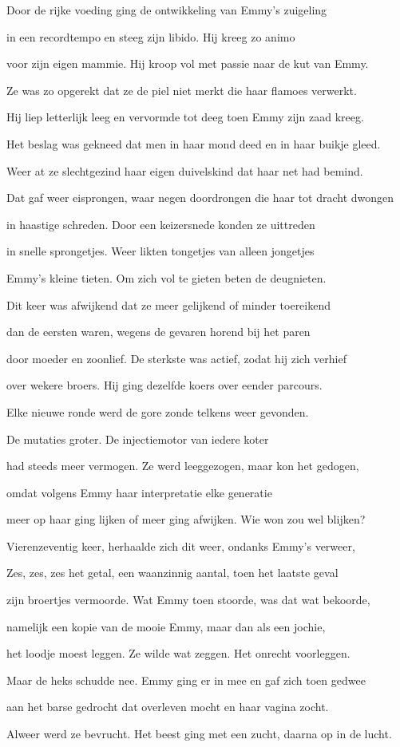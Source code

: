 Door de rijke voeding
ging de ontwikkeling
van Emmy’s zuigeling

in een recordtempo
en steeg zijn libido.
Hij kreeg zo animo

voor zijn eigen mammie.
Hij kroop vol met passie
naar de kut van Emmy.

Ze was zo opgerekt
dat ze de piel niet merkt
die haar flamoes verwerkt.

Hij liep letterlijk leeg
en vervormde tot deeg
toen Emmy zijn zaad kreeg.

Het beslag was gekneed
dat men in haar mond deed
en in haar buikje gleed.

Weer at ze slechtgezind
haar eigen duivelskind
dat haar net had bemind.

Dat gaf weer eisprongen,
waar negen doordrongen
die haar tot dracht dwongen

in haastige schreden.
Door een keizersnede
konden ze uittreden

in snelle sprongetjes.
Weer likten tongetjes
van alleen jongetjes

Emmy’s kleine tieten.
Om zich vol te gieten
beten de deugnieten.

Dit keer was afwijkend
dat ze meer gelijkend
of minder toereikend

dan de eersten waren,
wegens de gevaren
horend bij het paren

door moeder en zoonlief.
De sterkste was actief,
zodat hij zich verhief

over wekere broers.
Hij ging dezelfde koers
over eender parcours.

Elke nieuwe ronde
werd de gore zonde
telkens weer gevonden.

De mutaties groter.
De injectiemotor
van iedere koter

had steeds meer vermogen.
Ze werd leeggezogen,
maar kon het gedogen,

omdat volgens Emmy
haar interpretatie
elke generatie

meer op haar ging lijken
of meer ging afwijken.
Wie won zou wel blijken?

Vierenzeventig keer,
herhaalde zich dit weer,
ondanks Emmy’s verweer,

Zes, zes, zes het getal,
een waanzinnig aantal,
toen het laatste geval

zijn broertjes vermoorde.
Wat Emmy toen stoorde,
was dat wat bekoorde,

namelijk een kopie
van de mooie Emmy,
maar dan als een jochie,

het loodje moest leggen.
Ze wilde wat zeggen.
Het onrecht voorleggen.

Maar de heks schudde nee.
Emmy ging er in mee
en gaf zich toen gedwee

aan het barse gedrocht
dat overleven mocht
en haar vagina zocht.

Alweer werd ze bevrucht.
Het beest ging met een zucht,
daarna op in de lucht.
